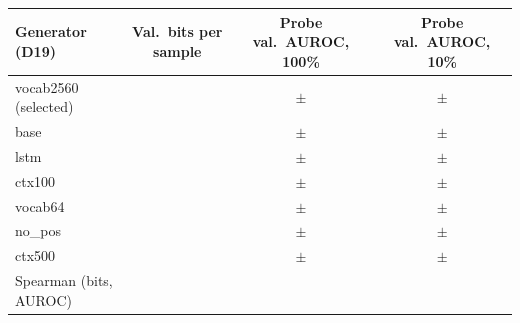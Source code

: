 \begin{tabular}{lccc}
\toprule
Generator (D19) & Val.\ bits per sample & Probe val.\ AUROC, 100\% & Probe val.\ AUROC, 10\% \\
\midrule
vocab2560 (selected) & \generativeBitsMeanVocabTwoFiveSixZero{} & \transferValAurocMeanProbeFOneZeroZero{} $\pm$ \transferValAurocSdProbeFOneZeroZero{} & \transferValAurocMeanProbeFOneZero{} $\pm$ \transferValAurocSdProbeFOneZero{} \\
base & \generativeBitsMeanBase{} & \transferValAurocMeanProbeBaseFOneZeroZero{} $\pm$ \transferValAurocSdProbeBaseFOneZeroZero{} & \transferValAurocMeanProbeBaseFOneZero{} $\pm$ \transferValAurocSdProbeBaseFOneZero{} \\
lstm & \generativeBitsMeanLstm{} & \transferValAurocMeanProbeLstmFOneZeroZero{} $\pm$ \transferValAurocSdProbeLstmFOneZeroZero{} & \transferValAurocMeanProbeLstmFOneZero{} $\pm$ \transferValAurocSdProbeLstmFOneZero{} \\
ctx100 & \generativeBitsMeanCtxOneZeroZero{} & \transferValAurocMeanProbeCtxOneZeroZeroFOneZeroZero{} $\pm$ \transferValAurocSdProbeCtxOneZeroZeroFOneZeroZero{} & \transferValAurocMeanProbeCtxOneZeroZeroFOneZero{} $\pm$ \transferValAurocSdProbeCtxOneZeroZeroFOneZero{} \\
vocab64 & \generativeBitsMeanVocabSixFour{} & \transferValAurocMeanProbeVocabSixFourFOneZeroZero{} $\pm$ \transferValAurocSdProbeVocabSixFourFOneZeroZero{} & \transferValAurocMeanProbeVocabSixFourFOneZero{} $\pm$ \transferValAurocSdProbeVocabSixFourFOneZero{} \\
no\_pos & \generativeBitsMeanNoPos{} & \transferValAurocMeanProbeNoPosFOneZeroZero{} $\pm$ \transferValAurocSdProbeNoPosFOneZeroZero{} & \transferValAurocMeanProbeNoPosFOneZero{} $\pm$ \transferValAurocSdProbeNoPosFOneZero{} \\
ctx500 & \generativeBitsMeanCtxFiveZeroZero{} & \transferValAurocMeanProbeCtxFiveZeroZeroFOneZeroZero{} $\pm$ \transferValAurocSdProbeCtxFiveZeroZeroFOneZeroZero{} & \transferValAurocMeanProbeCtxFiveZeroZeroFOneZero{} $\pm$ \transferValAurocSdProbeCtxFiveZeroZeroFOneZero{} \\
\midrule
Spearman (bits, AUROC) & & \transferProbeSpearmanFOneZeroZero{} & \transferProbeSpearmanFOneZero{} \\
\bottomrule
\end{tabular}

